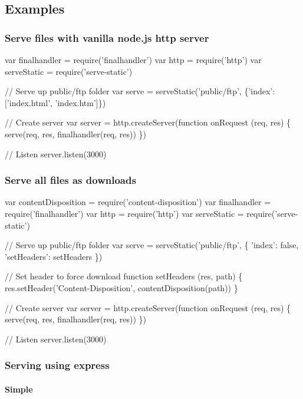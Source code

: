 \subsection*{Examples}

\subsubsection*{Serve files with vanilla node.\+js http server}


\begin{DoxyCode}
var finalhandler = require('finalhandler')
var http = require('http')
var serveStatic = require('serve-static')

// Serve up public/ftp folder
var serve = serveStatic('public/ftp', \{'index': ['index.html', 'index.htm']\})

// Create server
var server = http.createServer(function onRequest (req, res) \{
  serve(req, res, finalhandler(req, res))
\})

// Listen
server.listen(3000)
\end{DoxyCode}


\subsubsection*{Serve all files as downloads}


\begin{DoxyCode}
var contentDisposition = require('content-disposition')
var finalhandler = require('finalhandler')
var http = require('http')
var serveStatic = require('serve-static')

// Serve up public/ftp folder
var serve = serveStatic('public/ftp', \{
  'index': false,
  'setHeaders': setHeaders
\})

// Set header to force download
function setHeaders (res, path) \{
  res.setHeader('Content-Disposition', contentDisposition(path))
\}

// Create server
var server = http.createServer(function onRequest (req, res) \{
  serve(req, res, finalhandler(req, res))
\})

// Listen
server.listen(3000)
\end{DoxyCode}


\subsubsection*{Serving using express}

\paragraph*{Simple}

